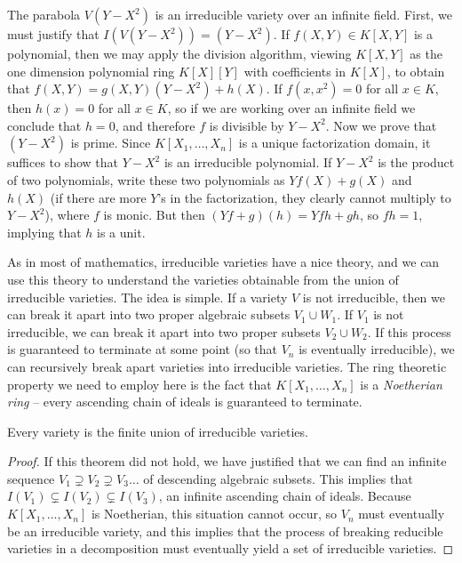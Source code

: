 \begin{example}
    The parabola $V(Y - X^2)$ is an irreducible variety over an infinite field. First, we must justify that $I(V(Y - X^2)) = (Y - X^2)$. If $f(X,Y) \in K[X,Y]$ is a polynomial, then we may apply the division algorithm, viewing $K[X,Y]$ as the one dimension polynomial ring $K[X][Y]$ with coefficients in $K[X]$, to obtain that $f(X,Y) = g(X,Y) (Y - X^2) + h(X)$. If $f(x,x^2) = 0$ for all $x \in K$, then $h(x) = 0$ for all $x \in K$, so if we are working over an infinite field we conclude that $h = 0$, and therefore $f$ is divisible by $Y - X^2$. Now we prove that $(Y - X^2)$ is prime. Since $K[X_1, \dots, X_n]$ is a unique factorization domain, it suffices to show that $Y - X^2$ is an irreducible polynomial. If $Y - X^2$ is the product of two polynomials, write these two polynomials as $Yf(X) + g(X)$ and $h(X)$ (if there are more $Y$'s in the factorization, they clearly cannot multiply to $Y - X^2$), where $f$ is monic. But then $(Yf + g)(h) = Yfh + gh$, so $fh = 1$, implying that $h$ is a unit.
\end{example}

As in most of mathematics, irreducible varieties have a nice theory, and we can use this theory to understand the varieties obtainable from the union of irreducible varieties. The idea is simple. If a variety $V$ is not irreducible, then we can break it apart into two proper algebraic subsets $V_1 \cup W_1$. If $V_1$ is not irreducible, we can break it apart into two proper subsets $V_2 \cup W_2$. If this process is guaranteed to terminate at some point (so that $V_n$ is eventually irreducible), we can recursively break apart varieties into irreducible varieties. The ring theoretic property we need to employ here is the fact that $K[X_1, \dots, X_n]$ is a {\it Noetherian ring} -- every ascending chain of ideals is guaranteed to terminate.

\begin{prop}
    Every variety is the finite union of irreducible varieties.
\end{prop}
\begin{proof}
    If this theorem did not hold, we have justified that we can find an infinite sequence $V_1 \supsetneq V_2 \supsetneq V_3 \dots$ of descending algebraic subsets. This implies that $I(V_1) \subsetneq I(V_2) \subsetneq I(V_3)$, an infinite ascending chain of ideals. Because $K[X_1, \dots, X_n]$ is Noetherian, this situation cannot occur, so $V_n$ must eventually be an irreducible variety, and this implies that the process of breaking reducible varieties in a decomposition must eventually yield a set of irreducible varieties.
\end{proof}

